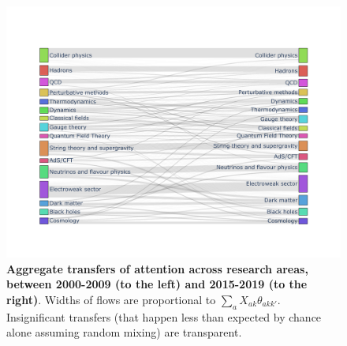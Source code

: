 \documentclass{article}
\begin{document}
 \begin{figure}
     \centering
     \includegraphics[width=\textwidth]{plots/sankey_control.pdf}
     \caption{\textbf{Aggregate transfers of attention across research areas, between 2000-2009 (to the left) and 2015-2019 (to the right)}. Widths of flows are proportional to $\sum_a X_{ak}\theta_{akk'}$. Insignificant transfers (that happen less than expected by chance alone assuming random mixing) are transparent. }
     \label{fig:sankey}
 \end{figure}





\end{document}
